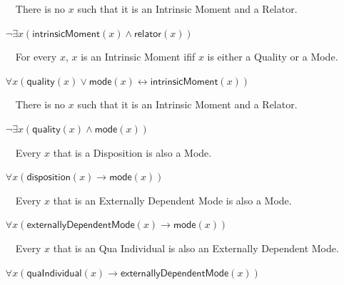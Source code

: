 \documentclass{article}
\newcommand{\AxLabel}{a}
\newcounter{cntax}
\newcommand{\myax}[1]{\refstepcounter{cntax}{\bf \small \AxLabel\thecntax}\label{#1}$\,\,\,\,$}
\newcommand{\me}[1]{\textsf{#1}}
\begin{document}
\begin{itemize}
    
    \item[\myax{ax_moment_partition}] There is no $x$ such that it is an \me{Intrinsic Moment} and a \me{Relator}.
    
    $\neg \exists x(\textsf{intrinsicMoment}(x)\wedge \textsf{relator}(x))$
    
    

    \item[\myax{ax_intrinsicMoment_taxonomy}] For every $x$, $x$ is an \me{Intrinsic Moment} ifif $x$ is either a \me{Quality} or a \me{Mode}.
    
    $\forall x(\textsf{quality}(x)\vee \textsf{mode}(x)\leftrightarrow \textsf{intrinsicMoment}(x))$
    
    
    
    
    \item[\myax{ax_intrinsicMoment_partition}] There is no $x$ such that it is an \me{Intrinsic Moment} and a \me{Relator}.
    
    $\neg \exists x(\textsf{quality}(x)\wedge \textsf{mode}(x))$
    
    

    \item[\myax{ax_mode_taxonomy_disposition}] Every $x$ that is a \me{Disposition} is also a \me{Mode}.
    
    $\forall x(\textsf{disposition}(x)\rightarrow \textsf{mode}(x))$
    
    

    \item[\myax{ax_mode_taxonomy_externallyDependentMode}] Every $x$ that is an \me{Externally Dependent Mode} is also a \me{Mode}.
    
    $\forall x(\textsf{externallyDependentMode}(x)\rightarrow \textsf{mode}(x))$
    
    

    \item[\myax{ax_externallyDependentMode_taxonomy_quaIndividual}] Every $x$ that is an \me{Qua Individual} is also an \me{Externally Dependent Mode}.
    
    $\forall x(\textsf{quaIndividual}(x)\rightarrow \textsf{externallyDependentMode}(x))$
    
    
\end{itemize}
\end{document}
